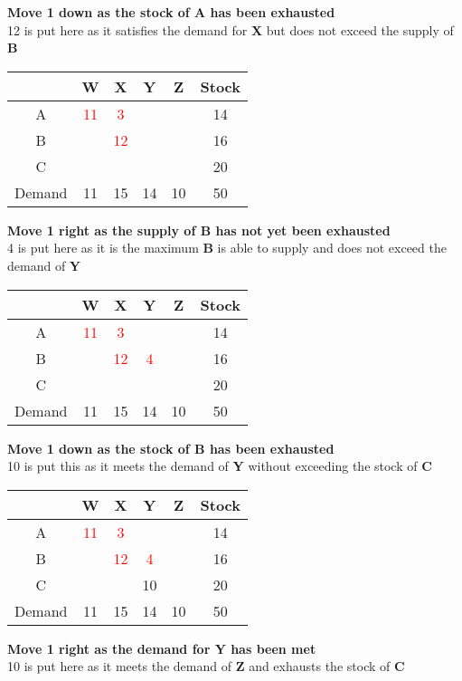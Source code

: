 \documentclass{article}[18pt]
\newcommand{\cred}[1]{\color{red}#1}
\begin{document}
\textbf{Move 1 down as the stock of A has been exhausted}\\
12 is put here as it satisfies the demand for \textbf{X} but does not exceed the supply of \textbf{B}
\begin{center}
\begin{tabular}{ |c|c|c|c|c|c| }
\hline
&W&X&Y&Z&Stock\\
\hline
A&\textcolor{red}{11}&\textcolor{red}{3}&&&14\\
\hline
B&&\textcolor{red}{12}&&&16\\
\hline
C&&&&&20\\
\hline
Demand&11&15&14&10&50\\ 
\hline
\end{tabular}
\end{center}
\textbf{Move 1 right as the supply of B has not yet been exhausted}\\
4 is put here as it is the maximum \textbf{B} is able to supply and does not exceed the demand of \textbf{Y}
\begin{center}
\begin{tabular}{ |c|c|c|c|c|c| }
\hline
&W&X&Y&Z&Stock\\
\hline
A&\textcolor{red}{11}&\textcolor{red}{3}&&&14\\
\hline
B&&\textcolor{red}{12}&\textcolor{red}{4}&&16\\
\hline
C&&&&&20\\
\hline
Demand&11&15&14&10&50\\ 
\hline
\end{tabular}
\end{center}
\textbf{Move 1 down as the stock of B has been exhausted}\\
10 is put this as it meets the demand of \textbf{Y} without exceeding the stock of \textbf{C}
\begin{center}
\begin{tabular}{ |c|c|c|c|c|c| }
\hline
&W&X&Y&Z&Stock\\
\hline
A&\textcolor{red}{11}&\textcolor{red}{3}&&&14\\
\hline
B&&\textcolor{red}{12}&\textcolor{red}{4}&&16\\
\hline
C&&&\cred{10}&&20\\
\hline
Demand&11&15&14&10&50\\ 
\hline
\end{tabular}
\end{center}
\textbf{Move 1 right as the demand for Y has been met}\\
10 is put here as it meets the demand of \textbf{Z} and exhausts the stock of \textbf{C}
\end{document}
